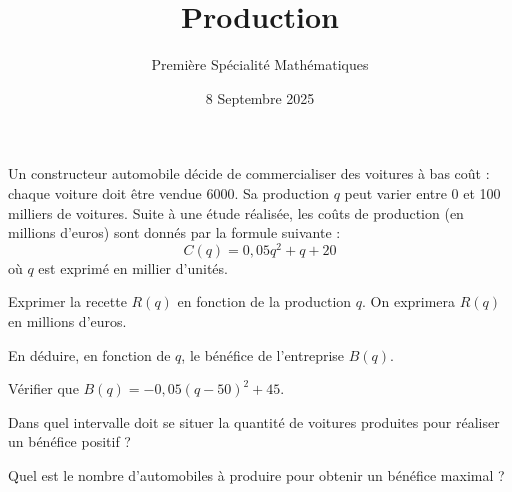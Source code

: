 \documentclass{exos}
\title{Production}
\date{8 Septembre 2025}
\author{Première Spécialité Mathématiques}
\begin{document}
\maketitle

\begin{tcolorbox}
Un constructeur automobile décide de commercialiser des voitures à bas coût : chaque voiture doit être vendue \qty{6000}{}. Sa production $q$ peut varier entre \num{0} et \num{100} milliers de voitures. Suite à une étude réalisée, les coûts de production (en millions d'euros) sont donnés par la formule suivante :
\begin{equation*}
C(q) = 0,05q^2 + q + 20
\end{equation*}
où $q$ est exprimé en millier d'unités.
\end{tcolorbox}
\begin{alphaquestions}
\item Exprimer la recette $R(q)$ en fonction de la production $q$. On exprimera $R(q)$ en millions d'euros.
\item En déduire, en fonction de $q$, le bénéfice de l'entreprise $B(q)$.
\item Vérifier que $B(q) = -0,05(q - 50)^2 + 45$.
\item Dans quel intervalle doit se situer la quantité de voitures produites pour réaliser un bénéfice positif ?
\item Quel est le nombre d'automobiles à produire pour obtenir un bénéfice maximal ?
\end{alphaquestions}
\end{document}
